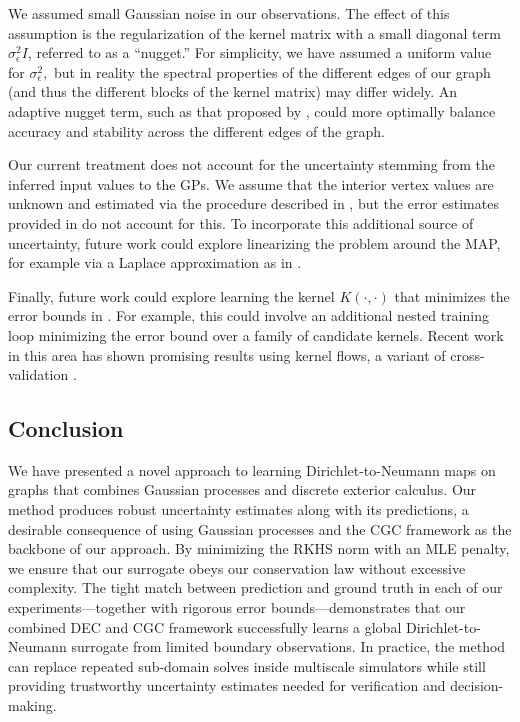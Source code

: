 \documentclass{article}
\theoremstyle{definition}
\theoremstyle{remark}
\begin{document}
We assumed small Gaussian noise in our observations. The effect of this assumption is the regularization of the kernel matrix with a small diagonal term $\sigma_{\epsilon}^2 I$, referred to as a ``nugget.'' For simplicity, we have assumed a uniform value for $\sigma_{\epsilon}^2,$ but in reality the spectral properties of the different edges of our graph (and thus the different blocks of the kernel matrix) may differ widely. An adaptive nugget term, such as that proposed by \cite{chen_solving_2021}, could more optimally balance accuracy and stability across the different edges of the graph.

Our current treatment does not account for the uncertainty stemming from the inferred input values to the GPs. We assume that the interior vertex values are unknown and estimated via the procedure described in , but the error estimates provided in  do not account for this. To incorporate this additional source of uncertainty, future work could explore linearizing the problem around the MAP, for example via a Laplace approximation as in \cite{chen_gaussian_2024}.

Finally, future work could explore learning the kernel $K(\cdot,\cdot)$ that minimizes the error bounds in . For example, this could involve an additional nested training loop minimizing the error bound over a family of candidate kernels. Recent work in this area has shown promising results using kernel flows, a variant of cross-validation \cite{learningkernels2,learningkernels}.


\subsection{Conclusion}
We have presented a novel approach to learning Dirichlet-to-Neumann maps on graphs that combines Gaussian processes and discrete exterior calculus. Our method produces robust uncertainty estimates along with its predictions, a desirable consequence of using Gaussian processes and the CGC framework as the backbone of our approach. By minimizing the RKHS norm with an MLE penalty, we ensure that our surrogate obeys our conservation law without excessive complexity. The tight match between prediction and ground truth in each of our experiments---together with rigorous error bounds---demonstrates that our combined DEC and CGC framework successfully learns a global Dirichlet-to-Neumann surrogate from limited boundary observations. In practice, the method can replace repeated sub-domain solves inside multiscale simulators while still providing trustworthy uncertainty estimates needed for verification and decision-making.
\end{document}
